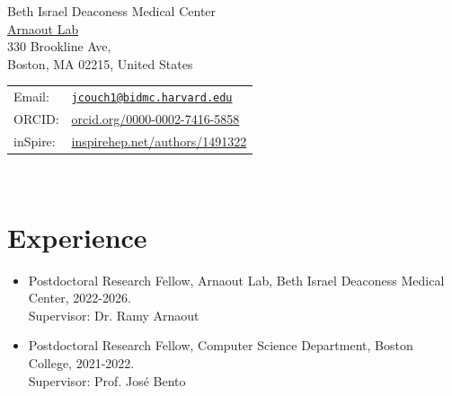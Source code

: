 {\huge \name}


\vspace{0.25in}

\begin{minipage}{0.45\linewidth}
  Beth Israel Deaconess Medical Center \\
  \href{https://arnaoutlab.org/}{Arnaout Lab}\\
  330 Brookline Ave, \\
  Boston, MA 02215, United States
\end{minipage}
\begin{minipage}{0.45\linewidth}
  \begin{tabular}{ll}
    Email: & \href{mailto:jcouch1@bidmc.harvard.edu}{\tt jcouch1@bidmc.harvard.edu} \\
    ORCID: & \href{https://orcid.org/0000-0002-7416-5858}{orcid.org/0000-0002-7416-5858} \\
    inSpire: & \href{https://inspirehep.net/authors/1491322}{inspirehep.net/authors/1491322} \\
  \end{tabular}
\end{minipage}
\

%

\section*{Experience}

\begin{itemize}

\item Postdoctoral Research Fellow, Arnaout Lab, Beth Israel Deaconess Medical Center, \hfill  2022-2026.\\
  Supervisor: Dr. Ramy Arnaout \\

\item Postdoctoral Research Fellow, Computer Science Department, Boston College, \hfill  2021-2022.\\
  Supervisor: Prof. Jos\'e Bento \\

\end{itemize}

